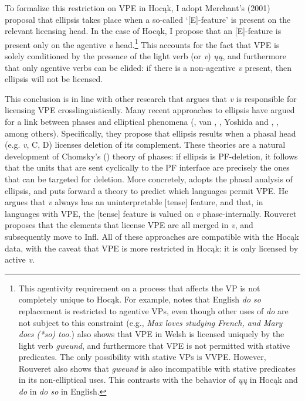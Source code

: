 \documentclass[output=paper]{LSP/langsci}
\begin{document}
To formalize this restriction on VPE in Hocąk, I adopt Merchant's (2001) proposal that ellipsis takes place when a so-called `[E]-feature' is present on the relevant licensing head. In the case of Hocąk, I propose that an [E]-feature is present only on the agentive \emph{v} head.\footnote{This agentivity requirement on a process that affects the VP is not completely unique to Hocąk. For example, \citet{Hallman2004} notes that English \emph{do so} replacement is restricted to agentive VPs, even though other uses of \emph{do} are not subject to this constraint (e.g., \emph{Max loves studying French, and Mary does (*so) too.}) \citet{Rouveret2012} also shows that VPE in Welsh is licensed uniquely by the light verb \emph{gweund}, and furthermore that VPE is not permitted with stative predicates. The only possibility with stative VPs is VVPE. However, Rouveret also shows that \emph{gweund} is also incompatible with stative predicates in its non-elliptical uses. This contrasts with the behavior of \emph{ųų} in Hocąk and \emph{do} in \emph{do so} in English.}  This accounts for the fact that VPE is solely conditioned by the presence of the light verb (or \emph{v}) \emph{ųų}, and furthermore that only agentive verbs can be elided: if there is a non-agentive \emph{v} present, then ellipsis will not be licensed. 

This conclusion is in line with other research that argues that \emph{v} is responsible for licensing VPE crosslinguistically. Many recent approaches to ellipsis have argued for a link between phases and elliptical phenomena (\citealt{Holmberg2001}, van \citealt{Craenenbroeck2004}, \citealt{Gengel2007}, Yoshida and \citealt{Gallego2008}, \citealt{Gallego2009}, among others). Specifically, they propose that ellipsis results when a phasal head (e.g. \emph{v}, C, D) licenses deletion of its complement. These theories are a natural development of Chomsky's (\citeyear{Chomsky2000,Chomsky2001,Chomsky2004}) theory of phases: if ellipsis is PF-deletion, it follows that the units that are sent cyclically to the PF interface are precisely the ones that can be targeted for deletion. More concretely, \citet{Rouveret2012} adopts the phasal analysis of ellipsis, and puts forward a theory to predict which languages permit VPE. He argues that \emph{v} always has an uninterpretable [tense] feature, and that, in languages with VPE, the [tense] feature is valued on \emph{v} phase-internally. Rouveret proposes that the elements that license VPE are all merged in \emph{v}, and subsequently move to Infl. All of these approaches are compatible with the Hocąk data, with the caveat that VPE is more restricted in Hocąk: it is only licensed by active \emph{v}.
\end{document}

